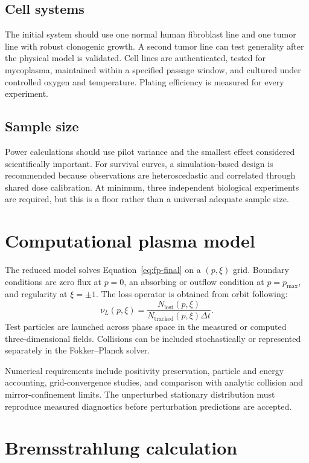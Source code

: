 \subsection{Cell systems}

The initial system should use one normal human fibroblast line and one tumor line with robust clonogenic growth. A second tumor line can test generality after the physical model is validated. Cell lines are authenticated, tested for mycoplasma, maintained within a specified passage window, and cultured under controlled oxygen and temperature. Plating efficiency is measured for every experiment.

\subsection{Sample size}

Power calculations should use pilot variance and the smallest effect considered scientifically important. For survival curves, a simulation-based design is recommended because observations are heteroscedastic and correlated through shared dose calibration. At minimum, three independent biological experiments are required, but this is a floor rather than a universal adequate sample size.

\section{Computational plasma model}

The reduced model solves Equation~\eqref{eq:fp-final} on a $(p,\xi)$ grid. Boundary conditions are zero flux at $p=0$, an absorbing or outflow condition at $p=p_{\max}$, and regularity at $\xi=\pm1$. The loss operator is obtained from orbit following:
\begin{equation}
\nu_L(p,\xi)=\frac{N_{\mathrm{lost}}(p,\xi)}{N_{\mathrm{tracked}}(p,\xi)\Delta t}.
\end{equation}
Test particles are launched across phase space in the measured or computed three-dimensional fields. Collisions can be included stochastically or represented separately in the Fokker--Planck solver.

Numerical requirements include positivity preservation, particle and energy accounting, grid-convergence studies, and comparison with analytic collision and mirror-confinement limits. The unperturbed stationary distribution must reproduce measured diagnostics before perturbation predictions are accepted.

\section{Bremsstrahlung calculation}

